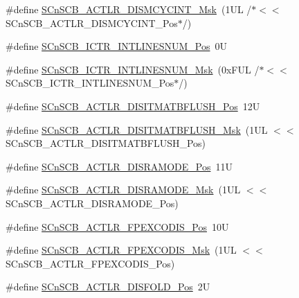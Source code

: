 \begin{DoxyCompactItemize}
\item 
\#define \hyperlink{group___c_m_s_i_s___s_cn_s_c_b_ga2a2818f0489ad10b6ea2964e899d4cbc}{S\-Cn\-S\-C\-B\-\_\-\-A\-C\-T\-L\-R\-\_\-\-D\-I\-S\-M\-C\-Y\-C\-I\-N\-T\-\_\-\-Msk}~(1\-U\-L /$\ast$$<$$<$ S\-Cn\-S\-C\-B\-\_\-\-A\-C\-T\-L\-R\-\_\-\-D\-I\-S\-M\-C\-Y\-C\-I\-N\-T\-\_\-\-Pos$\ast$/)
\item 
\#define \hyperlink{group___c_m_s_i_s___s_cn_s_c_b_ga0777ddf379af50f9ca41d40573bfffc5}{S\-Cn\-S\-C\-B\-\_\-\-I\-C\-T\-R\-\_\-\-I\-N\-T\-L\-I\-N\-E\-S\-N\-U\-M\-\_\-\-Pos}~0\-U
\item 
\#define \hyperlink{group___c_m_s_i_s___s_cn_s_c_b_ga3efa0f5210051464e1034b19fc7b33c7}{S\-Cn\-S\-C\-B\-\_\-\-I\-C\-T\-R\-\_\-\-I\-N\-T\-L\-I\-N\-E\-S\-N\-U\-M\-\_\-\-Msk}~(0x\-F\-U\-L /$\ast$$<$$<$ S\-Cn\-S\-C\-B\-\_\-\-I\-C\-T\-R\-\_\-\-I\-N\-T\-L\-I\-N\-E\-S\-N\-U\-M\-\_\-\-Pos$\ast$/)
\item 
\#define \hyperlink{group___c_m_s_i_s___s_cn_s_c_b_ga5f888e0ebc18cc2d99976405777c142f}{S\-Cn\-S\-C\-B\-\_\-\-A\-C\-T\-L\-R\-\_\-\-D\-I\-S\-I\-T\-M\-A\-T\-B\-F\-L\-U\-S\-H\-\_\-\-Pos}~12\-U
\item 
\#define \hyperlink{group___c_m_s_i_s___s_cn_s_c_b_ga46b16a03b408184720134ef42203ac2e}{S\-Cn\-S\-C\-B\-\_\-\-A\-C\-T\-L\-R\-\_\-\-D\-I\-S\-I\-T\-M\-A\-T\-B\-F\-L\-U\-S\-H\-\_\-\-Msk}~(1\-U\-L $<$$<$ S\-Cn\-S\-C\-B\-\_\-\-A\-C\-T\-L\-R\-\_\-\-D\-I\-S\-I\-T\-M\-A\-T\-B\-F\-L\-U\-S\-H\-\_\-\-Pos)
\item 
\#define \hyperlink{group___c_m_s_i_s___s_cn_s_c_b_ga1bffb5e05053d15cbe42fbe87d225dcb}{S\-Cn\-S\-C\-B\-\_\-\-A\-C\-T\-L\-R\-\_\-\-D\-I\-S\-R\-A\-M\-O\-D\-E\-\_\-\-Pos}~11\-U
\item 
\#define \hyperlink{group___c_m_s_i_s___s_cn_s_c_b_ga436fc1bd011b15c9585bb3ace5332ce3}{S\-Cn\-S\-C\-B\-\_\-\-A\-C\-T\-L\-R\-\_\-\-D\-I\-S\-R\-A\-M\-O\-D\-E\-\_\-\-Msk}~(1\-U\-L $<$$<$ S\-Cn\-S\-C\-B\-\_\-\-A\-C\-T\-L\-R\-\_\-\-D\-I\-S\-R\-A\-M\-O\-D\-E\-\_\-\-Pos)
\item 
\#define \hyperlink{group___c_m_s_i_s___s_cn_s_c_b_gaa743743f5af93d6ece74a426b355ab70}{S\-Cn\-S\-C\-B\-\_\-\-A\-C\-T\-L\-R\-\_\-\-F\-P\-E\-X\-C\-O\-D\-I\-S\-\_\-\-Pos}~10\-U
\item 
\#define \hyperlink{group___c_m_s_i_s___s_cn_s_c_b_gadd12baaeeea3220b03867e4b8a1432aa}{S\-Cn\-S\-C\-B\-\_\-\-A\-C\-T\-L\-R\-\_\-\-F\-P\-E\-X\-C\-O\-D\-I\-S\-\_\-\-Msk}~(1\-U\-L $<$$<$ S\-Cn\-S\-C\-B\-\_\-\-A\-C\-T\-L\-R\-\_\-\-F\-P\-E\-X\-C\-O\-D\-I\-S\-\_\-\-Pos)
\item 
\#define \hyperlink{group___c_m_s_i_s___s_cn_s_c_b_gaab395870643a0bee78906bb15ca5bd02}{S\-Cn\-S\-C\-B\-\_\-\-A\-C\-T\-L\-R\-\_\-\-D\-I\-S\-F\-O\-L\-D\-\_\-\-Pos}~2\-U
$$
\end{DoxyCompactItemize}
